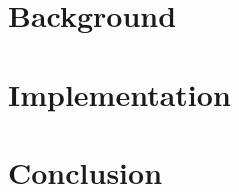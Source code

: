\documentclass[conference]{IEEEtran}
\begin{document}
\section{Background}
\section{Implementation}
\section{Conclusion}
\printbibliography
\end{document}
